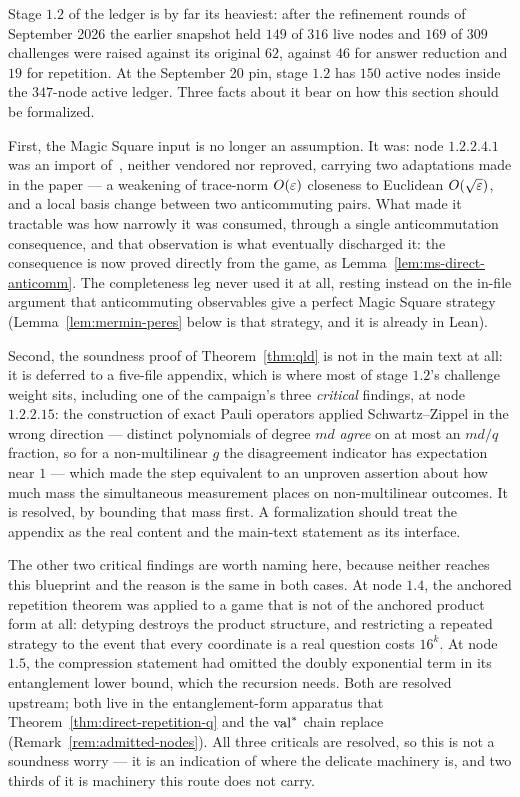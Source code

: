\begin{remark}
\label{rem:qld-admitted}
Stage $1.2$ of the ledger is by far its heaviest: after the refinement rounds of September
2026 the earlier snapshot held $149$ of $316$ live nodes and $169$ of $309$ challenges
were raised against its original $62$, against $46$ for answer reduction and $19$ for
repetition. At the September 20 pin, stage $1.2$ has $150$ active nodes
inside the $347$-node active ledger. Three facts about it bear on how this
section should be formalized.

First, the Magic Square input is no longer an assumption. It was: node $1.2.2.4.1$ was an
import of~\cite[Theorem 6.9]{CS17}, neither vendored nor reproved, carrying two adaptations
made in the paper --- a weakening of trace-norm $O(\varepsilon)$ closeness to Euclidean
$O(\sqrt{\varepsilon})$, and a local basis change between two anticommuting pairs. What made it
tractable was how narrowly it was consumed, through a single anticommutation consequence,
and that observation is what eventually discharged it: the consequence is now proved
directly from the game, as Lemma~\ref{lem:ms-direct-anticomm}. The completeness leg never
used it at all, resting instead on the in-file argument that anticommuting observables give
a perfect Magic Square strategy (Lemma~\ref{lem:mermin-peres} below is that strategy, and it
is already in Lean).

Second, the soundness proof of Theorem~\ref{thm:qld} is not in the main text at all: it is
deferred to a five-file appendix, which is where most of stage $1.2$'s challenge weight
sits, including one of the campaign's three \emph{critical} findings, at node $1.2.2.15$:
the construction of exact Pauli operators applied Schwartz--Zippel in the wrong direction
--- distinct polynomials of degree $md$ \emph{agree} on at most an $md/q$ fraction, so for a
non-multilinear $g$ the disagreement indicator has expectation near $1$ --- which made the
step equivalent to an unproven assertion about how much mass the simultaneous measurement
places on non-multilinear outcomes. It is resolved, by bounding that mass first. A
formalization should treat the appendix as the real content and the main-text statement as
its interface.

The other two critical findings are worth naming here, because neither reaches this
blueprint and the reason is the same in both cases. At node $1.4$, the anchored repetition
theorem was applied to a game that is not of the anchored product form at all: detyping
destroys the product structure, and restricting a repeated strategy to the event that every
coordinate is a real question costs $16^k$. At node $1.5$, the compression statement had
omitted the doubly exponential term in its entanglement lower bound, which the recursion
needs. Both are resolved upstream; both live in the entanglement-form apparatus that
Theorem~\ref{thm:direct-repetition-q} and the $\mathrm{val}^*$ chain replace
(Remark~\ref{rem:admitted-nodes}). All three criticals are resolved, so this is not a
soundness worry --- it is an indication of where the delicate machinery is, and two thirds
of it is machinery this route does not carry.


\end{remark}
